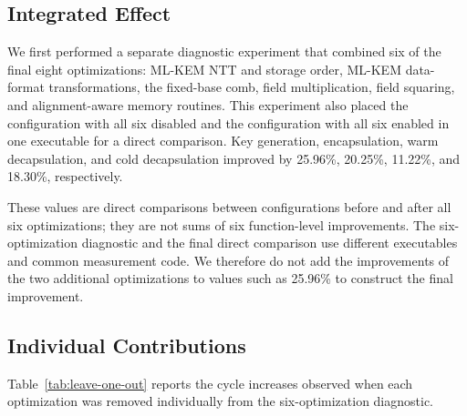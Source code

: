 \documentclass[runningheads,orivec]{llncs}
\begin{document}
\subsection{Integrated Effect}

We first performed a separate diagnostic experiment that combined six of the
final eight optimizations: ML-KEM NTT and storage order, ML-KEM data-format
transformations, the fixed-base comb, field multiplication, field squaring, and
alignment-aware memory routines. This experiment also placed the configuration
with all six disabled and the configuration with all six enabled in one
executable for a direct comparison. Key generation, encapsulation, warm
decapsulation, and cold decapsulation improved by 25.96\%, 20.25\%, 11.22\%, and
18.30\%, respectively.

These values are direct comparisons between configurations before and after all
six optimizations; they are not sums of six function-level improvements. The
six-optimization diagnostic and the final direct comparison use different
executables and common measurement code. We therefore do not add the
improvements of the two additional optimizations to values such as 25.96\% to
construct the final improvement.

\FloatBarrier
\subsection{Individual Contributions}

Table~\ref{tab:leave-one-out} reports the cycle increases observed when each
optimization was removed individually from the six-optimization diagnostic.
\begin{table}[t]
\caption{Leave-one-out results for the six-optimization diagnostic. Each value
is the cycle increase caused by removing one optimization and must not be added
to the improvements from the final direct comparison.}
\label{tab:leave-one-out}
\centering
\footnotesize
\setlength{\tabcolsep}{3.0pt}
\end{table}
\end{document}
